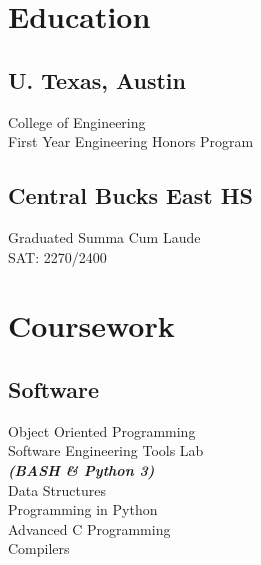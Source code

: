 \documentclass[letterpaper]{deedy-resume} %
\begin{document}
\begin{minipage}[t]{0.33\textwidth} %


\section{Education} 

\subsection{U. Texas, Austin}


\sectionspace %

College of Engineering \\
First Year Engineering Honors Program


\sectionspace %

\subsection{Central Bucks East HS}
Graduated Summa Cum Laude \\
SAT: 2270/2400

\section{Coursework}



\subsection{Software}

Object Oriented Programming \\
Software Engineering Tools Lab \\
{\footnotesize \textit{\textbf{(BASH \& Python 3) }}} \\
Data Structures \\
Programming in Python \\
Advanced C Programming \\
Compilers \\
\sectionspace

\end{minipage}
\end{document}
